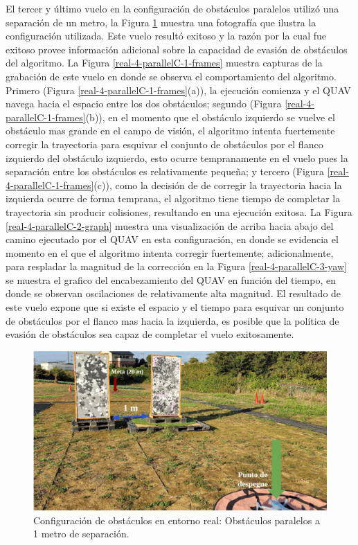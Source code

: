 El tercer y último vuelo en la configuración de obstáculos paralelos utilizó una separación de un metro, la Figura \ref{real-4-parallelC-0-config} muestra una fotografía que ilustra la configuración utilizada. Este vuelo resultó exitoso y la razón por la cual fue exitoso provee información adicional sobre la capacidad de evasión de obstáculos del algoritmo. La Figura \ref{real-4-parallelC-1-frames} muestra capturas de la grabación de este vuelo en donde se observa el comportamiento del algoritmo. Primero (Figura \ref{real-4-parallelC-1-frames}(a)), la ejecución comienza y el QUAV navega hacia el espacio entre los dos obstáculos; segundo (Figura \ref{real-4-parallelC-1-frames}(b)), en el momento que el obstáculo izquierdo se vuelve el obstáculo mas grande en el campo de visión, el algoritmo intenta fuertemente corregir la trayectoria para esquivar el conjunto de obstáculos por el flanco izquierdo del obstáculo izquierdo, esto ocurre tempranamente en el vuelo pues la separación entre los obstáculos es relativamente pequeña; y tercero (Figura \ref{real-4-parallelC-1-frames}(c)), como la decisión de de corregir la trayectoria hacia la izquierda ocurre de forma temprana, el algoritmo tiene tiempo de completar la trayectoria sin producir colisiones, resultando en una ejecución exitosa. La Figura \ref{real-4-parallelC-2-graph} muestra una visualización de arriba hacia abajo del camino ejecutado por el QUAV en esta configuración, en donde se evidencia el momento en el que el algoritmo intenta corregir fuertemente; adicionalmente, para respladar la magnitud de la corrección en la Figura \ref{real-4-parallelC-3-yaw} se muestra el grafico del encabezamiento del QUAV en función del tiempo, en donde se observan oscilaciones de relativamente alta magnitud. El resultado de este vuelo expone que si existe el espacio y el tiempo para esquivar un conjunto de obstáculos por el flanco mas hacia la izquierda, es posible que la política de evasión de obstáculos sea capaz de completar el vuelo exitosamente.

\begin{figure}[H]
    \centering
    \includegraphics[scale=0.25]{partes/img/real-4-parallelC-0-config.png}
    \caption[Configuración de obstáculos en entorno real: Obstáculos paralelos a 1 metro de separación.]{Configuración de obstáculos en entorno real: Obstáculos paralelos a 1 metro de separación.}
    \label{real-4-parallelC-0-config}
\end{figure}

